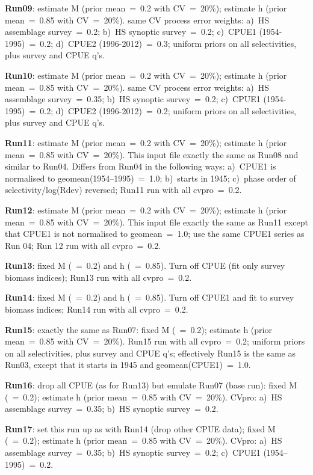 {\bf Run09}: estimate M (prior mean~=~0.2 with CV~=~20\%); estimate h (prior mean~=~0.85 with CV~=~20\%).  same CV process error weights: a)~HS assemblage survey~=~0.2; b)~HS synoptic survey~=~0.2; c)~CPUE1 (1954-1995)~=~0.2; d)~CPUE2 (1996-2012)~=~0.3; uniform priors on all selectivities, plus survey and CPUE q's. \newline

{\bf Run10}: estimate M (prior mean~=~0.2 with CV~=~20\%); estimate h (prior mean~=~0.85 with CV~=~20\%).  same CV process error weights: a)~HS assemblage survey~=~0.35; b)~HS synoptic survey~=~0.2; c)~CPUE1 (1954-1995)~=~0.2; d)~CPUE2 (1996-2012)~=~0.2; uniform priors on all selectivities, plus survey and CPUE q's.    \newline

{\bf Run11}: estimate M (prior mean~=~0.2 with CV~=~20\%); estimate h (prior mean~=~0.85 with CV~=~20\%).  This input file exactly the same as Run08 and similar to Run04.  Differs from Run04 in the following ways: a)~CPUE1 is normalised to geomean(1954--1995)~=~1.0; b)~starts in 1945; c)~phase order of selectivity/log(Rdev) reversed; Run11 run with all cvpro~=~0.2.  \newline

{\bf Run12}: estimate M (prior mean~=~0.2 with CV~=~20\%); estimate h (prior mean~=~0.85 with CV~=~20\%).  This input file exactly the same as Run11 except that CPUE1 is not normalised to geomean~=~1.0; use the same CPUE1 series as Run 04; Run 12 run with all cvpro~=~0.2.  \newline

{\bf Run13}: fixed M (~=~0.2) and h (~=~0.85).  Turn off CPUE (fit only survey biomass indices); Run13 run with all cvpro~=~0.2. \newline

{\bf Run14}: fixed M (~=~0.2) and h (~=~0.85).  Turn off CPUE1 and fit to survey biomass indices; Run14 run with all cvpro~=~0.2.  \newline

{\bf Run15}: exactly the same as Run07: fixed M (~=~0.2); estimate h (prior mean~=~0.85 with CV~=~20\%).  Run15 run with all cvpro~=~0.2; uniform priors on all selectivities, plus survey and CPUE q's; effectively Run15 is the same as Run03, except that it starts in 1945 and geomean(CPUE1)~=~1.0.  \newline

{\bf Run16}: drop all CPUE (as for Run13) but emulate Run07 (base run): fixed M (~=~0.2); estimate h (prior mean~=~0.85 with CV~=~20\%).  CVpro: a)~HS assemblage survey~=~0.35; b)~HS synoptic survey~=~0.2. \newline

{\bf Run17}: set this run up as with Run14 (drop other CPUE data);  fixed M (~=~0.2); estimate h (prior mean~=~0.85 with CV~=~20\%).  CVpro: a)~HS assemblage survey~=~0.35; b)~HS synoptic survey~=~0.2; c)~CPUE1 (1954--1995)~=~0.2. \newline


